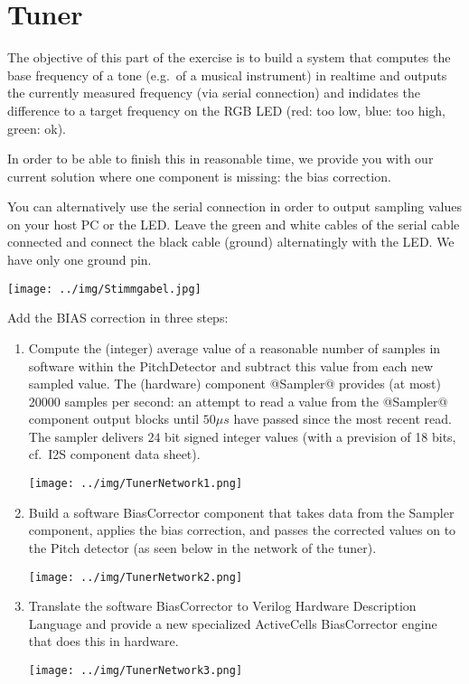 \documentclass[10pt, a4]{article}
\begin{document}
\section{Tuner}

\begin{minipage}{0.9\textwidth}
The objective of this part of the exercise is to build a system that computes the base frequency of a tone (e.g.\ of a musical instrument) in realtime and outputs the currently measured frequency (via serial connection) and indidates the difference to a target frequency on the RGB LED (red: too low, blue: too high, green: ok). 

In order to be able to finish this in reasonable time, we provide you with our current solution where one component is missing: the bias correction. 

You can alternatively use the serial connection in order to output sampling values on your host PC or the LED. Leave the green and white cables of the serial cable connected and connect the black cable (ground) alternatingly with the LED. We have only one ground pin.

\end{minipage}
\begin{minipage}{0.09\textwidth}
\begin{center}
\texttt{[image: ../img/Stimmgabel.jpg]}
\end{center}
\end{minipage}


Add the BIAS correction in three steps:
\begin{enumerate}
\item Compute the (integer) average value of a reasonable number of samples in software within the PitchDetector and subtract this value from each new sampled value. The (hardware) component @Sampler@ provides (at most) 20000 samples per second: an attempt to read a value from the @Sampler@ component output blocks until $50 \mu s$ have passed since the most recent read. The sampler delivers $24$ bit signed integer values (with a prevision of 18 bits, cf.\ I2S component data sheet).
\begin{center}
\texttt{[image: ../img/TunerNetwork1.png]}
\end{center}
\item Build a software BiasCorrector component that takes data from the Sampler component, applies the bias correction, and passes the corrected values on to the Pitch detector (as seen below in the network of the tuner).
\begin{center}
\texttt{[image: ../img/TunerNetwork2.png]}
\end{center}
\item Translate the software BiasCorrector to Verilog Hardware Description Language and provide a new specialized ActiveCells BiasCorrector engine that does this in hardware.
\begin{center}
\texttt{[image: ../img/TunerNetwork3.png]}
\end{center}
\end{enumerate}
\end{document}
